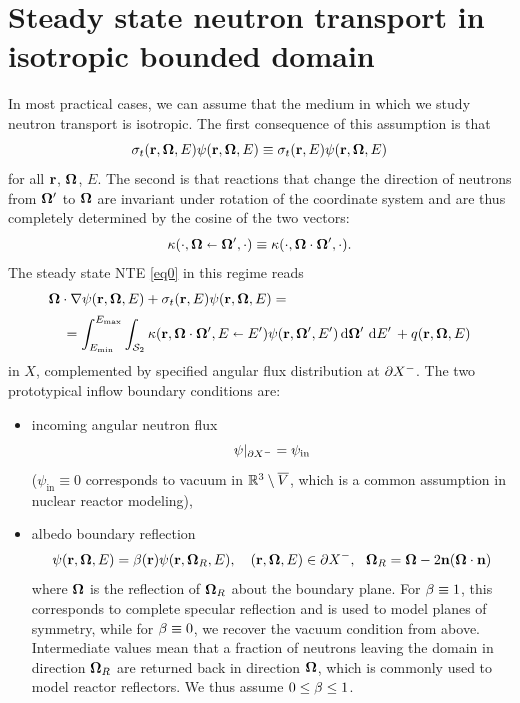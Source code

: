 \section{Steady state neutron transport in isotropic bounded domain}\label{sec:NTE}
In most practical cases, we can assume that the medium in which we study neutron transport is isotropic.
The first consequence of this assumption is that 
$$
	\sigma_t(\br,\bomega,E)\psi(\br,\bomega,E) \equiv \sigma_t(\br,E)\psi(\br,\bomega,E)
$$ 
for all $\br$, $\bomega$, $E$. The
second is that reactions that change the direction of neutrons from $\bomega'$ to $\bomega$ are
invariant under rotation of the coordinate system and are thus completely determined by the cosine of the two vectors:
\begin{equation}\label{eq:iso}
	\kappa(\cdot,\bomega\sla\bomega',\cdot) \equiv \kappa(\cdot,\bomega\cdot\bomega',\cdot).
\end{equation}
The steady state NTE \eqref{eq0} in this regime reads
\begin{equation}\label{eq1}
\begin{multlined}
  \bomega\cdot\nabla\psi(\br,\bomega,E) + \sigma_t(\br,E)\psi(\br,\bomega,E) =\\[.25em]
   = \intE[']{\Emin}{\Emax}{
      \intA[']{\kappa(\br,\bomega\cdot\bomega',E\sla E')\psi(\br,\bomega',E')}
    } + q(\br,\bomega,E)
 \end{multlined}
\end{equation}
in $X$, complemented by specified angular flux distribution at $\pX[-]$. The two prototypical inflow boundary
conditions are:
\begin{itemize}
	\item incoming angular neutron flux
	\begin{equation}\label{eq:nte2}
	  \psi\vert_{\pX[-]} = \psi_{\text{in}}
	\end{equation}\index{$\psi\vert_{\pX[\pm]}$}%
	($\psi_{\text{in}}\equiv 0$ corresponds to vacuum in $\R[3]\setminus \overline V$, which is a common
	 assumption in nuclear reactor modeling),%
	
	\item albedo boundary reflection
	\begin{equation}\label{eq:nte3}
  	\psi(\br,\bomega,E) = \albedo(\br)\psi(\br, \bomega_R, E),\quad (\br,\bomega,E)\in \pX[-],\ \ \bomega_R = \bomega - 2
  	\bn (\bomega \cdot \bn)
  \end{equation}%
  where $\bomega$ is the reflection of
  $\bomega_R$ about the boundary plane. For $\albedo \equiv 1$, this corresponds to complete specular reflection and is used to model planes of symmetry, while for $\albedo \equiv 0$, we recover the vacuum condition from above. Intermediate values mean that a fraction of neutrons leaving the domain in direction $\bomega_R$ are returned back in direction $\bomega$, which is commonly used to model reactor
  reflectors. We thus assume $0 \leq \albedo \leq 1$. 
\end{itemize}
